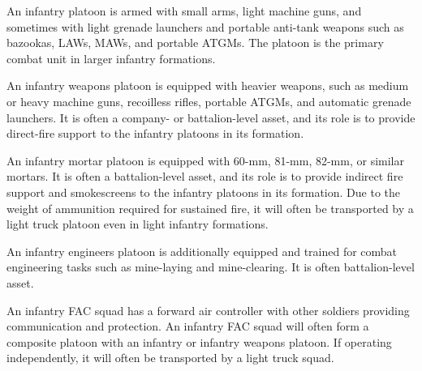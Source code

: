 \begin{withcounters}


    An infantry platoon is armed with small arms, light machine guns, and sometimes with light grenade launchers and portable anti-tank weapons such as bazookas, LAWs, MAWs, and portable ATGMs. The platoon is the primary combat unit in larger infantry formations.


    An infantry weapons platoon is equipped with heavier weapons, such as medium or heavy machine guns, recoilless rifles, portable ATGMs, and automatic grenade launchers.
    It is often a company- or battalion-level asset, and its role is to provide direct-fire support to the infantry platoons in its formation.%


    An infantry mortar platoon is equipped with 60-mm, 81-mm, 82-mm, or similar mortars.
    It is often a battalion-level asset, and its role is to provide indirect fire support and smokescreens to the infantry platoons in its formation.
    Due to the weight of ammunition required for sustained fire, it will often be transported by a light truck platoon even in light infantry formations.


    An infantry engineers platoon is additionally equipped and trained for combat engineering tasks such as mine-laying and mine-clearing.
    It is often battalion-level asset.


    An infantry FAC squad has a forward air controller with other soldiers providing communication and protection.
    An infantry FAC squad will often form a composite platoon with an infantry or infantry weapons platoon. If operating independently, it will often be transported by a light truck squad.


\end{withcounters}
